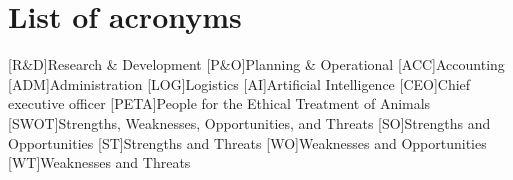 \chapter{List of acronyms}

\begin{acronym}[Acronyms]
  [R\&D]{Research \& Development}
  [P\&O]{Planning \& Operational}
  [ACC]{Accounting}
  [ADM]{Administration}
  [LOG]{Logistics}
  [AI]{Artificial Intelligence}
  [CEO]{Chief executive officer}
  [PETA]{People for the Ethical Treatment of Animals}
  [SWOT]{Strengths, Weaknesses, Opportunities, and Threats}
  [SO]{Strengths and Opportunities}
  [ST]{Strengths and Threats}
  [WO]{Weaknesses and Opportunities}
  [WT]{Weaknesses and Threats}
\end{acronym}